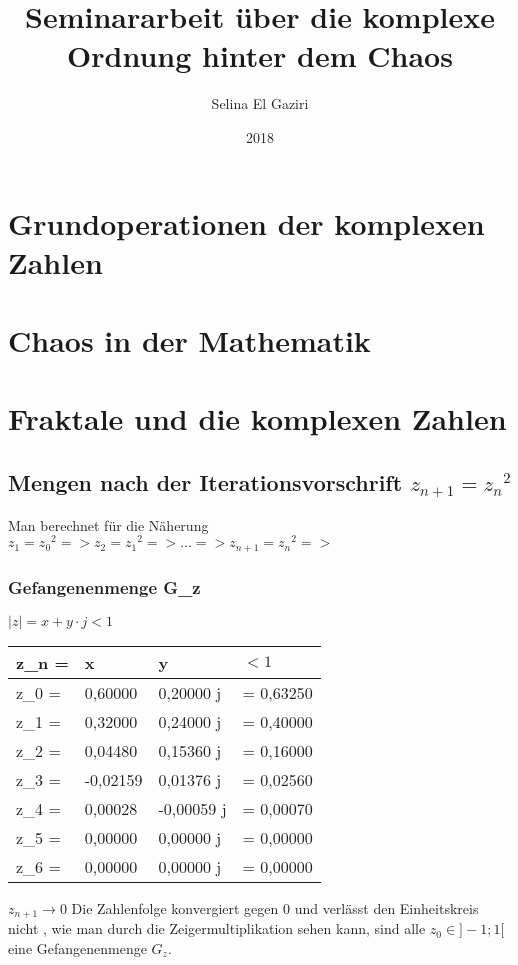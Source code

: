 \documentclass{article}
\title{Seminararbeit über die komplexe Ordnung hinter dem Chaos}
\author{Selina El Gaziri}
\date{2018}
\begin{document}
\maketitle
\newpage
\tableofcontents
\newpage
\section{Grundoperationen der komplexen Zahlen}

\section{Chaos in der Mathematik}

\section{Fraktale und die komplexen Zahlen}

\subsection{Mengen nach der Iterationsvorschrift $z_{n+1}={z_{n}}^2$ }
Man berechnet für die Näherung $ z_1={z_0}^2 => z_2={z_1}^2 => ... => z_{n+1}={z_{n}}^2 =>$
\subsubsection{Gefangenenmenge G_z}
\newline {} $|z| = x + y \cdot j < 1$ 
\newline

\noindent
\begin{tabularx}{10cm}{X|X|X|X}
z_{n} = & x & y &  $<1$\\
\hline
z_{0} = & 0,60000 & 0,20000 j & = 0,63250\\
\hline
z_{1} = & 0,32000 & 0,24000 j & = 0,40000\\
\hline
z_{2} =  & 0,04480 & 0,15360 j & = 0,16000\\
\hline
z_{3} = & -0,02159 & 0,01376 j & = 0,02560\\
\hline
z_{4} = & 0,00028	& -0,00059 j & = 0,00070\\
\hline
z_{5} = & 0,00000 & 0,00000 j & = 0,00000\\
\hline
z_{6} = & 0,00000 & 0,00000 j & = 0,00000\\
\end{tabularx}
$z_{n+1} \rightarrow 0$
\newline
\justyifying
\newline Die Zahlenfolge konvergiert gegen 0 und verlässt den Einheitskreis nicht , wie man durch die Zeigermultiplikation sehen kann, sind alle $ z_0   \in ]-1;1[$ eine Gefangenenmenge $G_z$.
\end{document}
